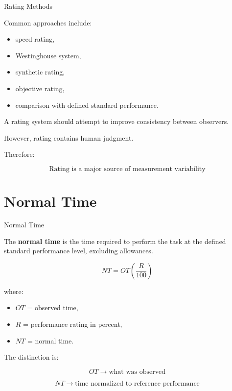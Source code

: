 \documentclass[aspectratio=169,10pt]{beamer}
\begin{document}

\begin{frame}[shrink=18]{Rating Methods}
\small

Common approaches include:

\begin{itemize}
    \item speed rating,
    \item Westinghouse system,
    \item synthetic rating,
    \item objective rating,
    \item comparison with defined standard performance.
\end{itemize}

A rating system should attempt to improve consistency between observers.

\vspace{5pt}

However, rating contains human judgment.

Therefore:

\[
\boxed{
\text{Rating is a major source of measurement variability}
}
\]

\end{frame}


\section{Normal Time}

\begin{frame}[shrink=18]{Normal Time}
\small

The \textbf{normal time} is the time required to perform the task
at the defined standard performance level, excluding allowances.

\[
\boxed{
NT=OT\left(\frac{R}{100}\right)
}
\]

where:

\begin{itemize}
    \item \(OT\) = observed time,
    \item \(R\) = performance rating in percent,
    \item \(NT\) = normal time.
\end{itemize}

\vspace{5pt}

The distinction is:

\[
\boxed{
OT \rightarrow \text{what was observed}
}
\]

\[
\boxed{
NT \rightarrow \text{time normalized to reference performance}
}
\]

\end{frame}
\end{document}
